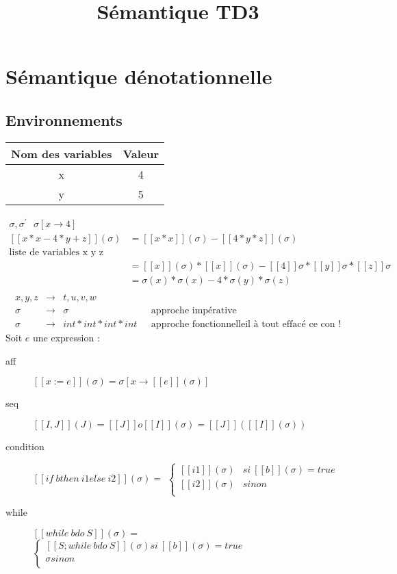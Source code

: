 \documentclass[11pt,a4paper]{article}
\title{Sémantique TD3}
\begin{document}
	\section*{Sémantique dénotationnelle}
	\subsection*{Environnements}
	\begin{tabular}{|c|c|}
		\hline 
		Nom des variables & Valeur \\ 
		\hline 
		x & 4 \\ 
		\hline 
		y & 5 \\ 
		\hline 
	\end{tabular}
	\begin{align*}
		\sigma ,{\sigma }^{\prime }\ \ \ \sigma \left[x{\to }4\right]\\
		[[x*x - 4*y+z]](\sigma) &= [[x*x]](\sigma) - [[4*y*z]](\sigma)\\
		\text{liste de variables x y z}&\\
		&= [[x]](\sigma) * [[x]](\sigma) - [[4]]\sigma*[[y]]\sigma*[[z]]\sigma\\
		&= \sigma(x) * \sigma(x) - 4 * \sigma(y) * \sigma(z)\\
	\end{align*}
	\begin{align*}
		x,y,z &\to &t,u,v,w\\
		\sigma &\to &\sigma &\ \ \ \text{approche impérative}\\
		\sigma &\to &int * int * int * int &\ \ \ \text{approche fonctionnelle}
		\text{il à tout effacé ce con !}
	\end{align*}
	Soit $e$ une expression :
	\begin{description}
		\item[aff] $[[x := e]](\sigma) = \sigma[x \to [[e]](\sigma)]$
		\item[seq]  $[[I, J]](J) = [[J]] o [[I]](\sigma) = [[J]]([[I]](\sigma))$
		\item[condition] $[[if\ b then\ i1 else\ i2]](\sigma) =$
		$\begin{cases}
			[[i1]](\sigma) & si\ [[b]](\sigma) = true\\
			[[i2]](\sigma) & sinon\\
		\end{cases}$
		\item[while] $[[while\ b do\ S]](\sigma) =$
		$\begin{cases}
			[[S; while\ b do\ S]](\sigma) si\ [[b]](\sigma) = true\\
			\sigma sinon\\
		\end{cases}$
	\end{description}
	\newpage
\end{document}
